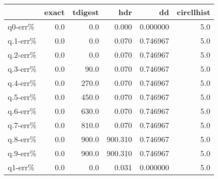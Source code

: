\begin{tabular}{lrrrrr}
\toprule
{} &  exact &  tdigest &      hdr &        dd &  circllhist \\
\midrule
q0-err\%  &    0.0 &      0.0 &    0.000 &  0.000000 &         5.0 \\
q.1-err\% &    0.0 &      0.0 &    0.070 &  0.746967 &         5.0 \\
q.2-err\% &    0.0 &      0.0 &    0.070 &  0.746967 &         5.0 \\
q.3-err\% &    0.0 &     90.0 &    0.070 &  0.746967 &         5.0 \\
q.4-err\% &    0.0 &    270.0 &    0.070 &  0.746967 &         5.0 \\
q.5-err\% &    0.0 &    450.0 &    0.070 &  0.746967 &         5.0 \\
q.6-err\% &    0.0 &    630.0 &    0.070 &  0.746967 &         5.0 \\
q.7-err\% &    0.0 &    810.0 &    0.070 &  0.746967 &         5.0 \\
q.8-err\% &    0.0 &    900.0 &  900.310 &  0.746967 &         5.0 \\
q.9-err\% &    0.0 &    900.0 &  900.310 &  0.746967 &         5.0 \\
q1-err\%  &    0.0 &      0.0 &    0.031 &  0.000000 &         5.0 \\
\bottomrule
\end{tabular}
